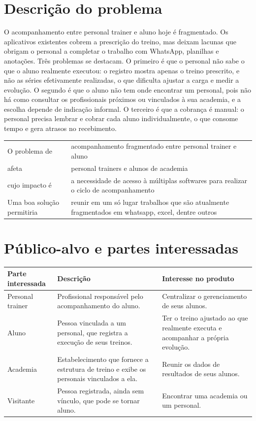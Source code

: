 \section{Descrição do problema}

O acompanhamento entre personal trainer e aluno hoje é fragmentado. Os aplicativos existentes cobrem a prescrição do treino, mas deixam lacunas que obrigam o personal a completar o trabalho com WhatsApp, planilhas e anotações. Três problemas se destacam. O primeiro é que o personal não sabe o que o aluno realmente executou: o registro mostra apenas o treino prescrito, e não as séries efetivamente realizadas, o que dificulta ajustar a carga e medir a evolução. O segundo é que o aluno não tem onde encontrar um personal, pois não há como consultar os profissionais próximos ou vinculados à sua academia, e a escolha depende de indicação informal. O terceiro é que a cobrança é manual: o personal precisa lembrar e cobrar cada aluno individualmente, o que consome tempo e gera atrasos no recebimento.

\begin{tabularx}{\textwidth}{@{}l L@{}}
  \toprule
  O problema de               & acompanhamento fragmentado entre personal trainer e aluno \\
  afeta                       & personal trainers e alunos de academia \\
  cujo impacto é              & a necessidade de acesso à múltiplas softwares para realizar o ciclo de acompanhamento \\
  Uma boa solução permitiria  & reunir em um só lugar trabalhos que são atualmente fragmentados em whatsapp, excel, dentre outros \\
  \bottomrule
\end{tabularx}

\section{Público-alvo e partes interessadas}

\begin{tabularx}{\textwidth}{@{}l L L@{}}
  \toprule
  \textbf{Parte interessada} & \textbf{Descrição} & \textbf{Interesse no produto} \\
  \midrule
  Personal trainer & Profissional responsável pelo acompanhamento do aluno. & Centralizar o gerenciamento de seus alunos. \\
  Aluno            & Pessoa vinculada a um personal, que registra a execução de seus treinos. & Ter o treino ajustado ao que realmente executa e acompanhar a própria evolução. \\
  Academia         & Estabelecimento que fornece a estrutura de treino e exibe os personais vinculados a ela. & Reunir os dados de resultados de seus alunos. \\
  Visitante        & Pessoa registrada, ainda sem vínculo, que pode se tornar aluno. & Encontrar uma academia ou um personal. \\
  \bottomrule
\end{tabularx}

